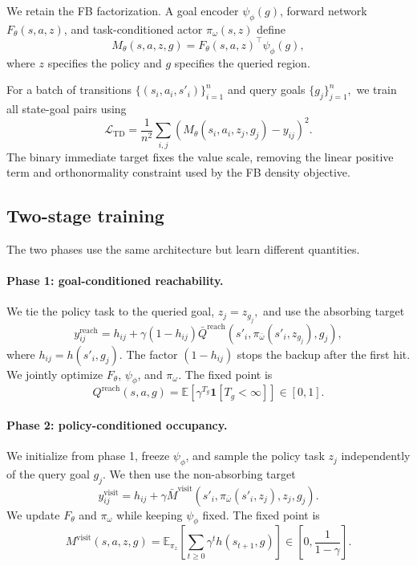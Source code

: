 \documentclass{article}
\newcommand{\E}{\mathbb{E}}
\newcommand{\ind}[1]{\mathbf{1}\!\left[#1\right]}
\newcommand{\Reach}{\mathrm{reach}}
\newcommand{\Visit}{\mathrm{visit}}
\begin{document}
We retain the FB factorization.
A goal encoder \( \psi_\phi(g)\), forward network \(F_\theta(s,a,z)\),  and task-conditioned actor \(\pi_\omega(s,z)\) define
\begin{equation}
    \label{eq:region-factorization}
    M_\theta(s,a,z,g) = F_\theta(s,a,z)^\top\psi_\phi(g),
\end{equation}
where $z$ specifies the policy and $g$ specifies the queried region.

For a batch of transitions $\{(s_i,a_i,s'_i)\}_{i=1}^n$ and query goals $\{g_j\}_{j=1}^n,$ we train all state-goal pairs using
\begin{equation}
\label{eq:matrix-loss}
\mathcal{L}_{\mathrm{TD}} = \frac{1}{n^2} \sum_{i,j} \left( M_\theta(s_i,a_i,z_j,g_j)-y_{ij} \right)^2.
\end{equation}
The binary immediate target fixes the value scale, removing the linear positive term and orthonormality constraint used by the FB density objective.

\subsection{Two-stage training}
\label{sec:two-stage}

The two phases use the same architecture but learn different quantities.

\paragraph{Phase 1: goal-conditioned reachability.}
We tie the policy task to the queried goal, $z_j=z_{g_j},$ and use the absorbing target
\begin{equation}
\label{eq:phase1-target}
y^{\Reach}_{ij} = h_{ij} + \gamma(1-h_{ij}) \bar Q^{\Reach} \left( s'_i, \pi_{\bar\omega}(s'_i,z_{g_j}), g_j \right),
\end{equation}
where $h_{ij}=h(s'_i,g_j)$.
The factor $(1-h_{ij})$ stops the backup after the first hit.
We jointly optimize $F_\theta$, $\psi_\phi$, and $\pi_\omega$.
The fixed point is
\begin{equation}
Q^{\Reach}(s,a,g) = \E\!\left[ \gamma^{T_g}\ind{T_g<\infty} \right] \in[0,1].
\end{equation}

\paragraph{Phase 2: policy-conditioned occupancy.}
We initialize from phase 1, freeze $\psi_\phi$, and sample the policy task $z_j$ independently of the query goal $g_j$.
We then use the non-absorbing target
\begin{equation}
\label{eq:phase2-target}
y^{\Visit}_{ij} = h_{ij} + \gamma \bar M^{\Visit} \left( s'_i, \pi_{\bar\omega}(s'_i,z_j), z_j, g_j \right).
\end{equation}
We update $F_\theta$ and $\pi_\omega$ while keeping $\psi_\phi$ fixed.
The fixed point is
\begin{equation}
M^{\Visit}(s,a,z,g) = \E_{\pi_z}\!\left[ \sum_{t\geq0} \gamma^t h(s_{t+1},g) \right] \in \left[ 0,\frac{1}{1-\gamma} \right].
\end{equation}
\end{document}

